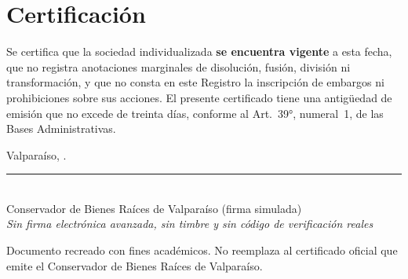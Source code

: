 \documentclass[carta,final]{lafrox}
\let\SIMoldsection\section
\renewcommand{\section}{\needspace{9\baselineskip}\SIMoldsection}
\begin{document}
\section*{Certificación}
\noindent Se certifica que la sociedad individualizada \textbf{se encuentra vigente} a esta fecha, que no registra anotaciones marginales de disolución, fusión, división ni transformación, y que no consta en este Registro la inscripción de embargos ni prohibiciones sobre sus acciones. El presente certificado tiene una antigüedad de emisión que no excede de treinta días, conforme al Art.~39°, numeral~1, de las Bases Administrativas.

\vspace{6pt}
\noindent Valparaíso, \SIMfechacorta.

\vspace{28pt}
\begin{center}
  \rule{6.4cm}{0.5pt}\\[2pt]
  Conservador de Bienes Raíces de Valparaíso (firma simulada)\\
  {\small\textit{Sin firma electrónica avanzada, sin timbre y sin código de verificación reales}}
\end{center}

\noindent\small Documento recreado con fines académicos. No reemplaza al certificado oficial que emite el Conservador de Bienes Raíces de Valparaíso.
\end{document}
